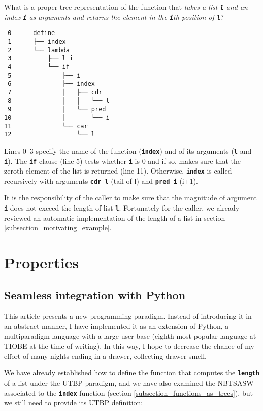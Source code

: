\documentclass[12pt,twocolumn]{article}
\begin{document}
What is a proper tree representation of the function that \emph{takes a list \texttt{\textbf{l}} and an index \texttt{\textbf{i}} as arguments and returns the element in the \texttt{\textbf{i}}th position of \texttt{\textbf{l}}}?

\begin{verbatim}
 0      define
 1      ├── index
 2      └── lambda
 3          ├── l i
 4          └── if
 5              ├── i
 6              ├── index
 7              │   ├── cdr
 8              │   │   └── l
 9              │   └── pred
10              │       └── i
11              └── car
12                  └── l
\end{verbatim}

Lines 0--3 specify the name of the function (\texttt{\textbf{index}}) and of its arguments (\texttt{\textbf{l}} and \texttt{\textbf{i}}). The \texttt{\textbf{if}} clause (line 5) tests whether \texttt{\textbf{i}} is 0 and if so, makes sure that the zeroth element of the list is returned (line 11). Otherwise, \texttt{\textbf{index}} is called recursively with arguments \texttt{\textbf{cdr l}} (tail of l) and \texttt{\textbf{pred i}} (i+1).

It is the responsibility of the caller to make sure that the magnitude of argument \texttt{\textbf{i}} does not exceed the length of list \texttt{\textbf{l}}. Fortunately for the caller, we already reviewed an automatic implementation of the length of a list in section \ref{subsection_motivating_example}.

\section{Properties}
\subsection{Seamless integration with Python}
This article presents a new programming paradigm. Instead of introducing it in an abstract manner, I have implemented it as an extension of Python, a multiparadigm language with a large user base (eighth most popular language at TIOBE at the time of writing\cite{TIOBE}). In this way, I hope to decrease the chance of my effort of many nights ending in a drawer, collecting drawer smell.

We have already established how to define the function that computes the \texttt{\textbf{length}} of a list under the UTBP paradigm, and we have also examined the NBTSASW associated to the \texttt{\textbf{index}} function (section \ref{subsection_functions_as_trees}), but we still need to provide its UTBP definition:
\end{document}
